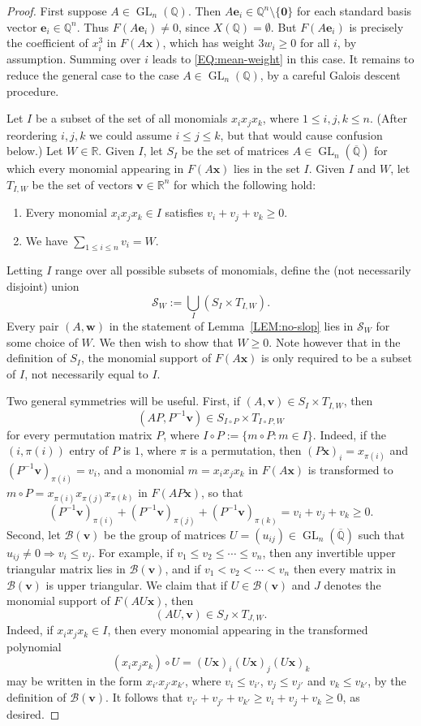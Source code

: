 \documentclass[a4paper,11pt, twoside,reqno]{amsart}
\theoremstyle{plain}
\theoremstyle{definition}
\theoremstyle{remark}
\newcommand{\bfe}{\bm{e}}
\newcommand{\bfv}{\bm{v}}
\newcommand{\bfx}{\bm{x}}
\newcommand{\RR}{\mathbb{R}}
\newcommand{\QQ}{\mathbb{Q}}
\DeclareMathOperator{\GL}{GL}
\renewcommand{\le}{\leqslant}
\renewcommand{\ge}{\geqslant}
\newcommand{\bfw}{\bm{w}}
\newcommand{\Qbar}{\overline{\mathbb{Q}}}
\numberwithin{equation}{section}
\begin{document}
\begin{proof}
First suppose $A\in \GL_n(\QQ)$.
Then $A\bfe_i \in \QQ^n \setminus \{\bm0\}$ for each standard basis vector $\bfe_i \in \QQ^n$.
Thus $F(A\bfe_i) \ne 0$, since $X(\QQ) = \emptyset$.
But $F(A\bfe_i)$ is precisely the coefficient of $x_i^3$ in $F(A\bfx)$,
which has weight  $3w_i \ge 0$ for all $i$, by assumption. 
Summing over $i$ leads to \eqref{EQ:mean-weight}
in this case.
It remains to reduce the general case
to the case $A\in \GL_n(\QQ)$,
by a careful Galois descent procedure.

Let $I$ be a subset of
the set of all monomials $x_ix_jx_k$,
where $1\le i,j,k\le n$.
(After reordering $i,j,k$ we could assume $i\le j\le k$,
but that would cause confusion below.)
Let $W\in \RR$.
Given $I$, let $S_I$ be the set of matrices $A\in \GL_n(\Qbar)$
for which every monomial appearing in $F(A\bfx)$
lies in the set $I$.
Given $I$ and $W$, let $T_{I,W}$ be the set of vectors $\bfv \in \RR^n$ for which the following hold:
\begin{enumerate}
\item Every monomial $x_ix_jx_k\in I$
satisfies $v_i+v_j+v_k \ge 0$.
\item We have $\sum_{1\le i\le n} v_i = W$.
\end{enumerate}
Letting $I$ range over all possible subsets of monomials,
define the (not necessarily disjoint) union
$${\textstyle \mathcal{S}_W := \bigcup_I (S_I \times T_{I,W}).}$$
Every pair $(A,\bfw)$ in the statement of Lemma~\ref{LEM:no-slop}
lies in $\mathcal{S}_W$
for some choice of $W$.
We then wish to show that $W\ge 0$.
Note however that in the definition of $S_I$,
the monomial support of $F(A\bfx)$
is only required to be a subset of $I$,
not necessarily equal to $I$.

Two general symmetries will be useful.
First, if $(A,\bfv)\in S_I \times T_{I,W}$,
then $$(AP,P^{-1}\bfv)\in S_{I\circ P} \times T_{I\circ P,W}$$
for every permutation matrix $P$,
where $I\circ P := \{m\circ P: m\in I\}$.
Indeed, if the $(i,\pi(i))$ entry of $P$ is $1$,
where $\pi$ is a permutation,
then $(P\bfx)_i = x_{\pi(i)}$ and $(P^{-1}\bfv)_{\pi(i)} = v_i$,
and a monomial $m=x_ix_jx_k$ in $F(A\bfx)$
is transformed to $m\circ P = x_{\pi(i)}x_{\pi(j)}x_{\pi(k)}$ in $F(AP\bfx)$,
so that $$(P^{-1}\bfv)_{\pi(i)} + (P^{-1}\bfv)_{\pi(j)} + (P^{-1}\bfv)_{\pi(k)}
= v_i + v_j + v_k \ge 0.$$
Second, let $\mathcal{B}(\bfv)$ be the group of matrices $U = (u_{ij}) \in \GL_n(\Qbar)$
such that $u_{ij} \ne 0 \Rightarrow v_i \le v_j$.
For example, if $v_1\le v_2\le \cdots \le v_n$,
then any invertible upper triangular matrix lies in $\mathcal{B}(\bfv)$,
and if $v_1<v_2<\cdots<v_n$ then every matrix in $\mathcal{B}(\bfv)$ is upper triangular.
We claim that if $U \in \mathcal{B}(\bfv)$
and $J$ denotes the monomial support of $F(AU\bfx)$,
then $$(AU,\bfv)\in S_J \times T_{J,W}.$$
Indeed, if $x_ix_jx_k \in I$,
then every monomial appearing
in the transformed polynomial $$(x_ix_jx_k) \circ U
= (U\bfx)_i(U\bfx)_j(U\bfx)_k$$
may be written in the form $x_{i'}x_{j'}x_{k'}$,
where $v_i\le v_{i'}$, $v_j\le v_{j'}$ and $v_k\le v_{k'}$,
by the definition of $\mathcal{B}(\bfv)$.
It follows that $v_{i'} + v_{j'} + v_{k'}
\ge v_i + v_j + v_k \ge 0$, as desired.


\end{proof}
\end{document}
